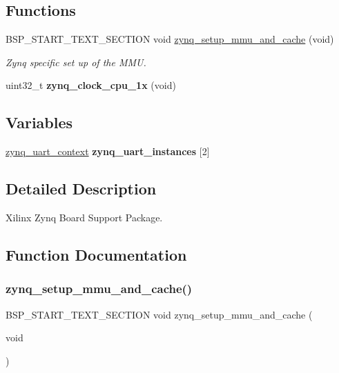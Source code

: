 \subsection*{Functions}
\begin{DoxyCompactItemize}
\item 
B\+S\+P\+\_\+\+S\+T\+A\+R\+T\+\_\+\+T\+E\+X\+T\+\_\+\+S\+E\+C\+T\+I\+ON void \mbox{\hyperlink{group__RTEMSBSPsARMZynq_ga6bf2b57b4e9ac66be0819f40f67c2145}{zynq\+\_\+setup\+\_\+mmu\+\_\+and\+\_\+cache}} (void)
\begin{DoxyCompactList}\small\item\em Zynq specific set up of the M\+MU. \end{DoxyCompactList}\item 
\mbox{\label{group__RTEMSBSPsARMZynq_ga594c91b3e2ff715e44212b7581a6a182}} 
uint32\+\_\+t {\bfseries zynq\+\_\+clock\+\_\+cpu\+\_\+1x} (void)
\end{DoxyCompactItemize}
\subsection*{Variables}
\begin{DoxyCompactItemize}
\item 
\mbox{\label{group__RTEMSBSPsARMZynq_ga05bf019cbe76790a9fd45e075ee8071c}} 
\mbox{\hyperlink{structzynq__uart__context}{zynq\+\_\+uart\+\_\+context}} {\bfseries zynq\+\_\+uart\+\_\+instances} \mbox{[}2\mbox{]}
\end{DoxyCompactItemize}


\subsection{Detailed Description}
Xilinx Zynq Board Support Package. 



\subsection{Function Documentation}
\mbox{\label{group__RTEMSBSPsARMZynq_ga6bf2b57b4e9ac66be0819f40f67c2145}} 
\subsubsection{\texorpdfstring{zynq\_setup\_mmu\_and\_cache()}{zynq\_setup\_mmu\_and\_cache()}}
{\footnotesize\ttfamily B\+S\+P\+\_\+\+S\+T\+A\+R\+T\+\_\+\+T\+E\+X\+T\+\_\+\+S\+E\+C\+T\+I\+ON void zynq\+\_\+setup\+\_\+mmu\+\_\+and\+\_\+cache (\begin{DoxyParamCaption}\item[{void}]{ }\end{DoxyParamCaption})}



